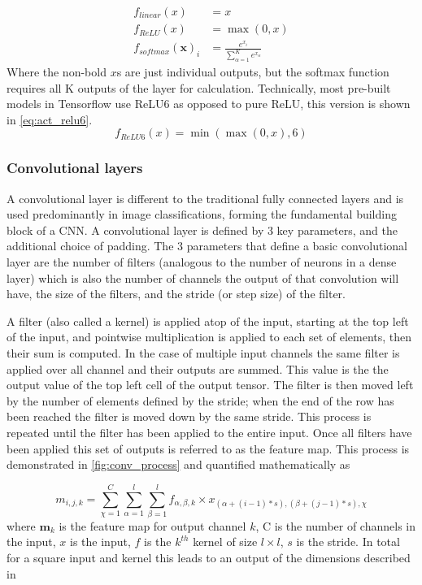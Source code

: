 \documentclass[12pt]{article}
\numberwithin{equation}{section}
\numberwithin{figure}{section}
\begin{document}
\begin{align}
	f_{linear}(x) &= x \label{eq:act_linear}\\
	f_{ReLU}(x)   &= \max(0, x) \label{eq:act_relu}\\
	f_{softmax}(\bm{x})_i &= \frac{e^{x_i}}{\sum_{\alpha=1}^{K}{e^{x_\alpha}}}\label{eq:act_softmax}
\end{align}
Where the non-bold $x$s are just individual outputs, but the softmax function requires all K outputs of the layer for calculation. Technically, most pre-built models in Tensorflow use ReLU6 as opposed to pure ReLU, this version is shown in \cref{eq:act_relu6}.
\begin{equation}
	f_{ReLU6}(x) = \min(\max(0, x), 6) \label{eq:act_relu6}
\end{equation}

\subsubsection{Convolutional layers}
A convolutional layer  is different to the traditional fully connected layers and is used predominantly in image classifications, forming the fundamental building block of a CNN. A convolutional layer is defined by 3 key parameters, and the additional choice of padding. The 3 parameters that define a basic convolutional layer are the number of filters (analogous to the number of neurons in a dense layer) which is also the number of channels the output of that convolution will have, the size of the filters, and the stride (or step size) of the filter. 

A filter (also called a kernel) is applied atop of the input, starting at the top left of the input, and pointwise multiplication is applied to each set of elements, then their sum is computed. In the case of multiple input channels the same filter is applied over all channel and their outputs are summed. This value is the the output value of the top left cell of the output tensor. The filter is then moved left by the number of elements defined by the stride; when the end of the row has been reached the filter is moved down by the same stride. This process is repeated until the filter has been applied to the entire input. Once all filters have been applied this set of outputs is referred to as the feature map. This process is demonstrated in \cref{fig:conv_process} and quantified mathematically as

\begin{equation}
	m_{i,j,k} = \sum_{\chi = 1}^{C}\sum_{\alpha = 1}^{l}\sum_{\beta = 1}^{l} f_{\alpha,\beta, k} \times x_{(\alpha +(i-1)*s), (\beta + (j-1)*s),\chi}
\end{equation}
where $\bm{m}_k$ is the feature map for output channel $k$, C is the number of channels in the input, $x$ is the input, $f$ is the $k^{th}$ kernel of size $l\times l$, $s$ is the stride. In total for a square input and kernel this leads to an output of the dimensions described in 
\end{document}
